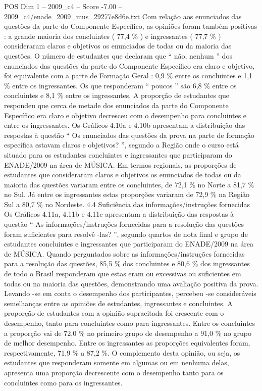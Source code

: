 \begin{textsample}{POS Dim 1 – 2009\_c4 – Score -7.00 – 2009\_c4/enade\_2009\_mus\_29277e8d6e.txt}
Com relação aos enunciados das questões da parte do Componente Específico, as opiniões foram também positivas : a grande maioria dos concluintes ( 77,4 \% ) e ingressantes ( 77,7 \% ) consideraram claros e objetivos os enunciados de todas ou da maioria das questões.
O número de estudantes que declaram que “ não, nenhum ” dos enunciados das questões da parte do Componente Específico era claro e objetivo, foi equivalente com a parte de Formação Geral : 0,9 \% entre os concluintes e 1,1 \% entre os ingressantes.
Os que responderam “ poucos ” são 6,8 \% entre os concluintes e 8,1 \% entre os ingressantes.
A proporção de estudantes que respondeu que cerca de metade dos enunciados da parte do Componente Específico era claro e objetivo decresceu com o desempenho para concluintes e entre os ingressantes.
Os Gráficos 4.10a e 4.10b apresentam a distribuição das respostas à questão “ Os enunciados das questões da prova na parte de formação específica estavam claros e objetivos? ”, segundo a Região onde o curso está situado para os estudantes concluintes e ingressantes que participaram do ENADE/2009 na área de MÚSICA.
Em termos regionais, as proporções de estudantes que consideraram claros e objetivos os enunciados de todas ou da maioria das questões variaram entre os concluintes, de 72,1 \% no Norte a 81,7 \% no Sul.
Já entre os ingressantes estas proporções variaram de 72,9 \% na Região Sul a 80,7 \% no Nordeste. 4.4 Suficiência das informações/instruções fornecidas Os Gráficos 4.11a, 4.11b e 4.11c apresentam a distribuição das respostas à questão “ As informações/instruções fornecidas para a resolução das questões foram suficientes para resolvê -las? ”, segundo quartos de nota final e grupo de estudantes concluintes e ingressantes que participaram do ENADE/2009 na área de MÚSICA.
Quando perguntados sobre as informações/instruções fornecidas para a resolução das questões, 85,5 \% dos concluintes e 80,6 \% dos ingressantes de todo o Brasil responderam que estas eram ou excessivas ou suficientes em todas ou na maioria das questões, demonstrando uma avaliação positiva da prova.
Levando -se em conta o desempenho dos participantes, percebeu -se consideráveis semelhanças entre as opiniões de estudantes, ingressantes e concluintes.
A proporção de estudantes com a opinião supracitada foi crescente com o desempenho, tanto para concluintes como para ingressantes.
Entre os concluintes a proporção vai de 72,0 \% no primeiro grupo de desempenho a 91,0 \% no grupo de melhor desempenho.
Entre os ingressantes as proporções equivalentes foram, respectivamente, 71,9 \% a 87,2 \%.
O complemento desta opinião, ou seja, os estudantes que responderam somente em algumas ou em nenhuma delas, apresenta uma proporção decrescente com o desempenho tanto para os concluintes como para os ingressantes.

\end{textsample}
